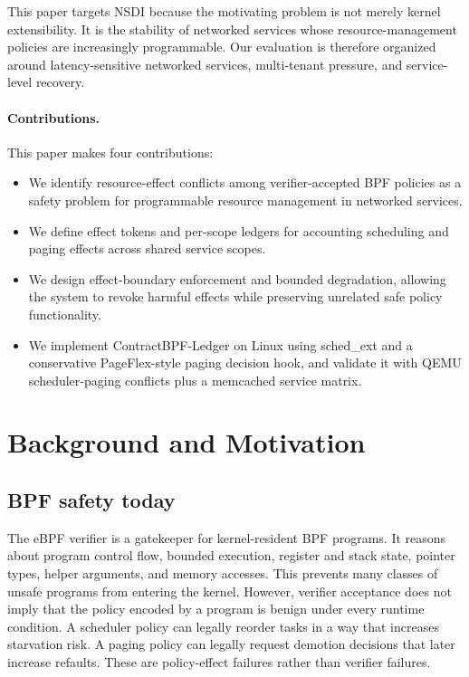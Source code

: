 \documentclass[letterpaper,twocolumn,10pt]{article}
\newcommand{\sys}{ContractBPF-Ledger\xspace}
\begin{document}
This paper targets NSDI because the motivating problem is not merely kernel extensibility. It is the stability of networked services whose resource-management policies are increasingly programmable. Our evaluation is therefore organized around latency-sensitive networked services, multi-tenant pressure, and service-level recovery.

\paragraph{Contributions.}
This paper makes four contributions:
\begin{itemize}[leftmargin=*]
    \item We identify resource-effect conflicts among verifier-accepted BPF policies as a safety problem for programmable resource management in networked services.
    \item We define effect tokens and per-scope ledgers for accounting scheduling and paging effects across shared service scopes.
    \item We design effect-boundary enforcement and bounded degradation, allowing the system to revoke harmful effects while preserving unrelated safe policy functionality.
    \item We implement \sys on Linux using sched\_ext and a conservative PageFlex-style paging decision hook, and validate it with QEMU scheduler-paging conflicts plus a memcached service matrix.
\end{itemize}

\section{Background and Motivation}

\subsection{BPF safety today}

The eBPF verifier is a gatekeeper for kernel-resident BPF programs. It reasons about program control flow, bounded execution, register and stack state, pointer types, helper arguments, and memory accesses. This prevents many classes of unsafe programs from entering the kernel. However, verifier acceptance does not imply that the policy encoded by a program is benign under every runtime condition. A scheduler policy can legally reorder tasks in a way that increases starvation risk. A paging policy can legally request demotion decisions that later increase refaults. These are policy-effect failures rather than verifier failures.
\end{document}
